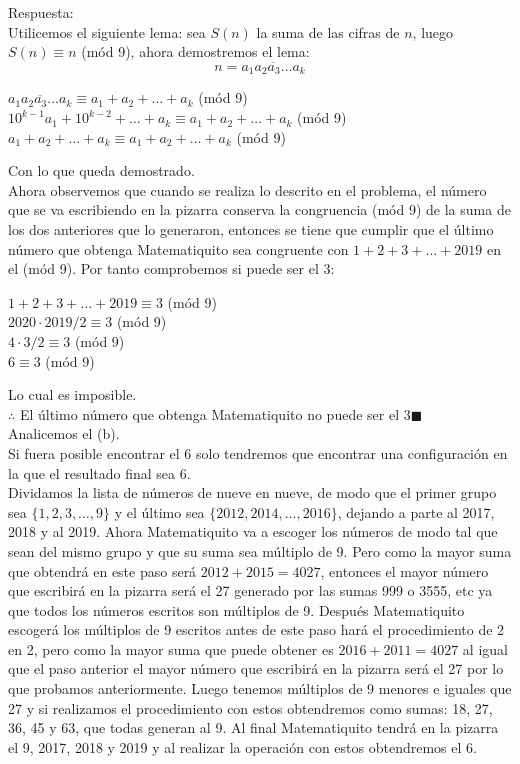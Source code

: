 \documentclass{book}
\begin{document}
\begin{enumerate}
\begin{enumerate}
					\end{enumerate} 
			 Respuesta:\\
			 Utilicemos el siguiente lema: sea $S(n)$ la suma de las cifras de $n$, luego $S(n)\equiv n$ (mód 9), ahora demostremos el lema:
			 $$n=\overline{a_1a_2a_3\ldots a_k}$$
			 \begin{center}
			 $\overline{a_1a_2a_3\ldots a_k}\equiv a_1+a_2+\ldots +a_k$ (mód 9)\\
			 $10^{k-1}a_1+10^{k-2}+\ldots+a_k\equiv a_1+a_2+\ldots +a_k$ (mód 9)\\
			 $a_1+a_2+\ldots +a_k\equiv a_1+a_2+\ldots +a_k$ (mód 9)
			 \end{center}
			 Con lo que queda demostrado.\\
			 Ahora observemos que cuando se realiza lo descrito en el problema, el número que se va escribiendo en la pizarra conserva la congruencia (mód 9) de la suma de los dos anteriores que lo generaron, entonces se tiene que cumplir que el último número que obtenga Matematiquito sea congruente con $1+2+3+\ldots+2019$ en el (mód 9). Por tanto comprobemos si puede ser el 3:
			 \begin{center}
			 $1+2+3+\ldots+2019\equiv 3$ (mód 9)\\
			 $2020\cdot 2019/2\equiv 3$ (mód 9)\\
			 $4\cdot 3/2\equiv 3$ (mód 9)\\
			 $6\equiv 3$ (mód 9)\\
			 \end{center}
			 Lo cual es imposible.\\
			 $\therefore$ El último número que obtenga Matematiquito no puede ser el 3$\blacksquare$\\
			 Analicemos el (b).\\
			 Si fuera posible encontrar el 6 solo tendremos que encontrar una configuración en la que el resultado final sea 6.\\
			 Dividamos la lista de números de nueve en nueve, de modo que el primer grupo sea $\{1, 2, 3, \ldots, 9\}$ y el último sea $\{2012, 2014 ,\ldots , 2016\}$, dejando a parte al 2017, 2018 y al 2019. Ahora Matematiquito va a escoger los números de modo tal que sean del mismo grupo y que su suma sea múltiplo de 9. Pero como la mayor suma que obtendrá en este paso será $2012+2015=4027$, entonces el mayor número que escribirá en la pizarra será el 27 generado por las sumas 999 o 3555, etc ya que todos los números escritos son múltiplos de 9. Después Matematiquito escogerá los múltiplos de 9 escritos antes de este paso hará el procedimiento de 2 en 2, pero como la mayor suma que puede obtener es $2016+2011=4027$ al igual que el paso anterior el mayor número que escribirá en la pizarra será el 27 por lo que probamos anteriormente. Luego tenemos múltiplos de 9 menores e iguales que 27 y si realizamos el procedimiento con estos obtendremos como sumas: 18, 27, 36, 45 y 63, que todas generan al 9. Al final Matematiquito tendrá en la pizarra el 9, 2017, 2018 y 2019 y al realizar la operación con estos obtendremos el 6.\\

\end{enumerate}
\end{document}
